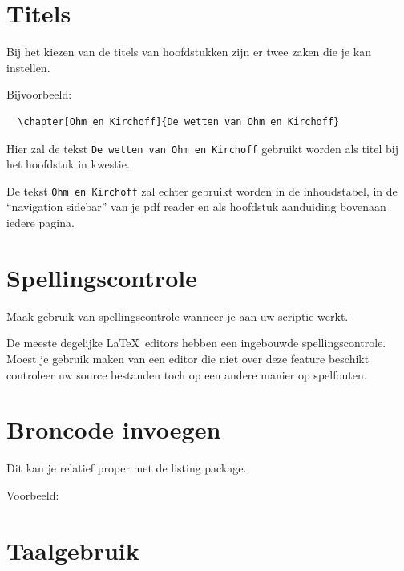 \section{Titels}

Bij het kiezen van de titels van hoofdstukken zijn er twee zaken die je kan instellen.

Bijvoorbeeld:

\begin{verbatim}
  \chapter[Ohm en Kirchoff]{De wetten van Ohm en Kirchoff}
\end{verbatim}

Hier zal de tekst \texttt{De wetten van Ohm en Kirchoff} gebruikt worden als titel bij het hoofdstuk in kwestie.

De tekst \texttt{Ohm en Kirchoff} zal echter gebruikt worden in de inhoudstabel, in de ``navigation sidebar'' van je pdf reader en als hoofdstuk aanduiding bovenaan iedere pagina.

\section{Spellingscontrole}

Maak gebruik van spellingscontrole wanneer je aan uw scriptie werkt.

De meeste degelijke \LaTeX\ editors hebben een ingebouwde spellingscontrole.
Moest je gebruik maken van een editor die niet over deze feature beschikt controleer uw source bestanden toch op een andere manier op spelfouten.

\section{Broncode invoegen}

Dit kan je relatief proper met de listing package.

Voorbeeld:

\lstset{numbers=left, stepnumber=1, basicstyle=\footnotesize, language=C++, caption=AcceleroDice: Minimal Implementation, label=AcceleroDice, frame=none, xleftmargin=.3in}


\section[taal]{Taalgebruik}

